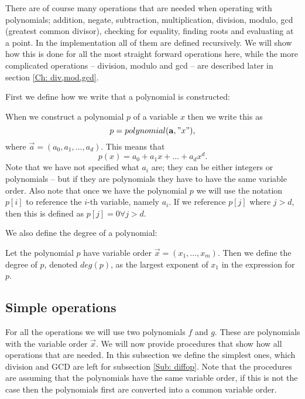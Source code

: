 There are of course many operations that are needed when operating with polynomials; addition, negate, subtraction, multiplication, division, modulo, gcd (greatest common divisor), checking for equality, finding roots and evaluating at a point. In the implementation all of them are defined recursively. We will show how this is done for all the most straight forward operations here, while the more complicated operations -- division, modulo and gcd -- are described later in section \ref{Ch: div,mod,gcd}.

First we define how we write that a polynomial is constructed:
\begin{definition}
  When we construct a polynomial $p$ of a variable $x$ then we write this as
  \begin{equation}
    p = polynomial(\vec{a},"x"),
  \end{equation}
  where $\vec{a}=(a_0,a_1,\ldots,a_d)$. This means that
  \begin{equation}
    p(x) = a_0 + a_1 x + \ldots + a_d x^d.
  \end{equation}
  Note that we have not specified what $a_i$ are; they can be either integers or polynomials -- but if they are polynomials they have to have the same variable order. Also note that once we have the polynomial $p$ we will use the notation $p[i]$ to reference the $i$-th variable, namely $a_i$. If we reference $p[j]$ where $j>d$, then this is defined as $p[j]=0 \forall j>d$.
\end{definition}

We also define the degree of a polynomial:
\begin{definition}
  Let the polynomial $p$ have variable order $\vec{x}=(x_1,\ldots,x_m)$. Then we define the degree of $p$, denoted $deg(p)$, as the largest exponent of $x_1$ in the expression for $p$.
\end{definition}

\subsection{Simple operations}\label{Sub: simpleop}

For all the operations we will use two polynomials $f$ and $g$. These are polynomials with the variable order $\vec{x}$. We will now provide procedures that show how all operations that are needed. In this subsection we define the simplest ones, which division and GCD are left for subsection \ref{Sub: diffop}. Note that the procedures are assuming that the polynomials have the same variable order, if this is not the case then the polynomials first are converted into a common variable order.

